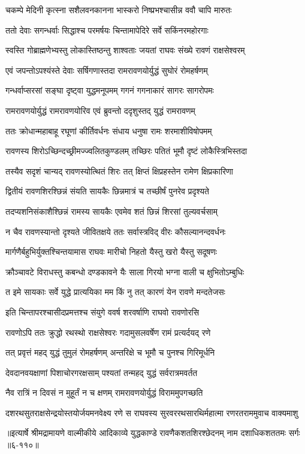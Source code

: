 \twolineshloka
{चकम्पे मेदिनी कृत्स्ना सशैलवनकानना}
{भास्करो निष्प्रभश्चासीन्न ववौ चापि मारुतः} %

\twolineshloka
{ततो देवाः सगन्धर्वाः सिद्धाश्च परमर्षयः}
{चिन्तामापेदिरे सर्वे सकिंनरमहोरगाः} %

\twolineshloka
{स्वस्ति गोब्राह्मणेभ्यस्तु लोकास्तिष्ठन्तु शाश्वताः}
{जयतां राघवः संख्ये रावणं राक्षसेश्वरम्} %

\twolineshloka
{एवं जपन्तोऽपश्यंस्ते देवाः सर्षिगणास्तदा}
{रामरावणयोर्युद्धं सुघोरं रोमहर्षणम्} %

\twolineshloka
{गन्धर्वाप्सरसां सङ्घा दृष्ट्वा युद्धमनूपमम्}
{गगनं गगनाकारं सागरः सागरोपमः} %

\twolineshloka
{रामरावणयोर्युद्धं रामरावणयोरिव}
{एवं ब्रुवन्तो ददृशुस्तद् युद्धं रामरावणम्} %

\twolineshloka
{ततः क्रोधान्महाबाहू रघूणां कीर्तिवर्धनः}
{संधाय धनुषा रामः शरमाशीविषोपमम्} %

\twolineshloka
{रावणस्य शिरोऽच्छिन्दच्छ्रीमज्ज्वलितकुण्डलम्}
{तच्छिरः पतितं भूमौ दृष्टं लोकैस्त्रिभिस्तदा} %

\twolineshloka
{तस्यैव सदृशं चान्यद् रावणस्योत्थितं शिरः}
{तत् क्षिप्तं क्षिप्रहस्तेन रामेण क्षिप्रकारिणा} %

\twolineshloka
{द्वितीयं रावणशिरश्छिन्नं संयति सायकैः}
{छिन्नमात्रं च तच्छीर्षं पुनरेव प्रदृश्यते} %

\twolineshloka
{तदप्यशनिसंकाशैश्छिन्नं रामस्य सायकैः}
{एवमेव शतं छिन्नं शिरसां तुल्यवर्चसाम्} %

\twolineshloka
{न चैव रावणस्यान्तो दृश्यते जीवितक्षये}
{ततः सर्वास्त्रविद् वीरः कौसल्यानन्दवर्धनः} %

\twolineshloka
{मार्गणैर्बहुभिर्युक्तश्चिन्तयामास राघवः}
{मारीचो निहतो यैस्तु खरो यैस्तु सदूषणः} %

\twolineshloka
{क्रौञ्चावटे विराधस्तु कबन्धो दण्डकावने}
{यैः साला गिरयो भग्ना वाली च क्षुभितोऽम्बुधिः} %

\twolineshloka
{त इमे सायकाः सर्वे युद्धे प्रात्ययिका मम}
{किं नु तत् कारणं येन रावणे मन्दतेजसः} %

\twolineshloka
{इति चिन्तापरश्चासीदप्रमत्तश्च संयुगे}
{ववर्ष शरवर्षाणि राघवो रावणोरसि} %

\twolineshloka
{रावणोऽपि ततः क्रुद्धो रथस्थो राक्षसेश्वरः}
{गदामुसलवर्षेण रामं प्रत्यर्दयद् रणे} %

\twolineshloka
{तत् प्रवृत्तं महद् युद्धं तुमुलं रोमहर्षणम्}
{अन्तरिक्षे च भूमौ च पुनश्च गिरिमूर्धनि} %

\twolineshloka
{देवदानवयक्षाणां पिशाचोरगरक्षसाम्}
{पश्यतां तन्महद् युद्धं सर्वरात्रमवर्तत} %

\twolineshloka
{नैव रात्रिं न दिवसं न मुहूर्तं न च क्षणम्}
{रामरावणयोर्युद्धं विराममुपगच्छति} %

\twolineshloka
{दशरथसुतराक्षसेन्द्रयोस्तयोर्जयमनवेक्ष्य रणे स राघवस्य}
{सुरवररथसारथिर्महात्मा रणरतराममुवाच वाक्यमाशु} %


॥इत्यार्षे श्रीमद्रामायणे वाल्मीकीये आदिकाव्ये युद्धकाण्डे रावणैकशतशिरश्छेदनम् नाम दशाधिकशततमः सर्गः ॥६-११०॥
